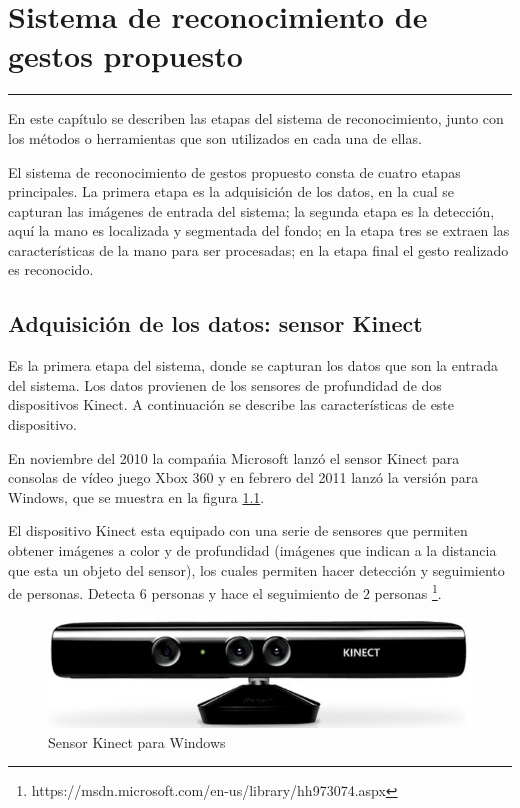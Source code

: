\chapter{Sistema de reconocimiento de gestos propuesto}\label{capit:cap3}
\vspace{-2.0325ex}%
\noindent
\rule{\textwidth}{0.5pt}
\vspace{-5.5ex}%
\newcommand{\pushline}{\Indp}%

En este cap\'itulo se describen las etapas del sistema de reconocimiento, junto con los métodos o herramientas que son utilizados en cada una de ellas.   

El sistema de reconocimiento de gestos propuesto consta de cuatro etapas principales. La primera etapa es la adquisición de los datos, en la cual se capturan las imágenes de entrada del sistema; la segunda etapa es la detección, aquí la mano es localizada y segmentada del fondo; en la etapa tres se extraen las características de la mano para ser procesadas; en la etapa final el gesto realizado es reconocido.   
 
  
  
\section{Adquisición de los datos: sensor Kinect}\label{KinectSensor} 

Es la primera etapa del sistema, donde se capturan los datos que son la entrada del sistema. Los datos provienen de los sensores de profundidad de dos dispositivos Kinect. A continuación se describe las características de este dispositivo. 

En noviembre del 2010 la compa\'nia Microsoft lanz\'o el sensor Kinect para consolas de vídeo juego Xbox 360 y en febrero del 2011 lanz\'o la versi\'on para Windows, que se muestra en la figura \ref{fig:KinectPic}.  

El dispositivo Kinect esta equipado con una serie de sensores que permiten obtener imágenes a color y de profundidad (imágenes que indican a la distancia que esta un objeto del sensor), los cuales permiten hacer detección y seguimiento de personas. Detecta $6$ personas y hace el seguimiento de $2$ personas \footnote{https://msdn.microsoft.com/en-us/library/hh973074.aspx}.    
  
\begin{figure}[h!]
\begin{center}
\includegraphics[scale=.6]{./Figures/Kinect.jpg}
\end{center}
\caption{Sensor Kinect para Windows}
\label{fig:KinectPic}
\end{figure} 

